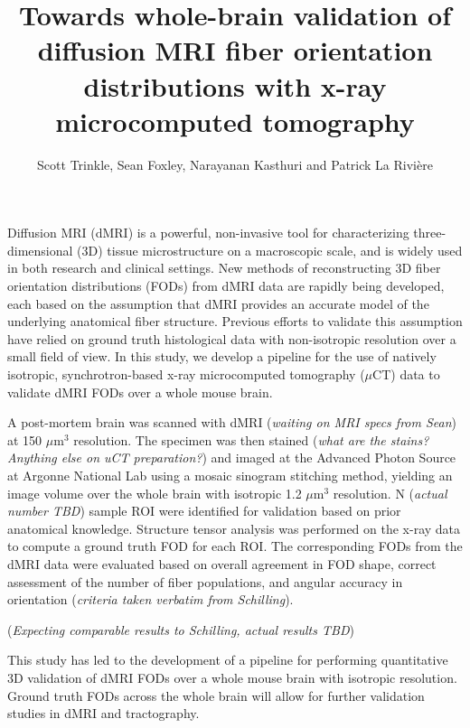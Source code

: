 \documentclass[11pt]{article}
\title{Towards whole-brain validation of diffusion MRI fiber orientation distributions with x-ray microcomputed tomography}
\author{Scott Trinkle, Sean Foxley, Narayanan Kasthuri and Patrick La Rivi\`ere}
\date{}
\begin{document}
\maketitle

Diffusion MRI (dMRI) is a powerful, non-invasive tool for characterizing
three-dimensional (3D) tissue microstructure on a macroscopic scale, and is
widely used in both research and clinical settings. New methods of
reconstructing 3D fiber orientation distributions (FODs) from dMRI data are
rapidly being developed, each based on the assumption that dMRI provides an
accurate model of the underlying anatomical fiber structure. Previous efforts to
validate this assumption have relied on ground truth histological data with
non-isotropic resolution over a small field of view. In this study, we
develop a pipeline for the use of natively isotropic, synchrotron-based x-ray microcomputed
tomography ($\mu$CT) data to validate dMRI FODs over a whole mouse brain.

A post-mortem brain was scanned with dMRI (\textit{waiting on MRI specs from
  Sean}) at 150 $\mu\text{m}^3$ resolution. The specimen was then stained
(\textit{what are the stains? Anything else on uCT preparation?}) and imaged at
the Advanced Photon Source at Argonne National Lab using a mosaic sinogram
stitching method, yielding an image volume over the whole brain with isotropic
1.2 $\mu\text{m}^3$ resolution. N (\textit{actual number TBD}) sample ROI were
identified for validation based on prior anatomical knowledge. Structure tensor
analysis was performed on the x-ray data to compute a ground truth FOD for each
ROI. The corresponding FODs from the dMRI data were evaluated based on overall
agreement in FOD shape, correct assessment of the number of fiber populations,
and angular accuracy in orientation (\textit{criteria taken verbatim from
  Schilling}).

(\textit{Expecting comparable results to Schilling, actual results TBD}) 

This study has led to the development of a pipeline for performing quantitative
3D validation of dMRI FODs over a whole mouse brain with isotropic resolution.
Ground truth FODs across the whole brain will allow for further validation studies
in dMRI and tractography. 


\end{document}
